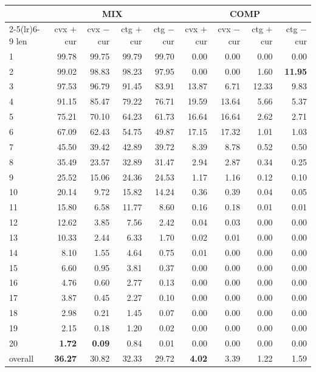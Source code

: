 \documentclass[11pt]{article}
\begin{document}
\begin{table}[h]\centering\footnotesize
\begin{tabular}{lrrrrrrrr}
\toprule
& \multicolumn{4}{c}{MIX} & \multicolumn{4}{c}{COMP} \\
\cmidrule(lr){2-5}\cmidrule(lr){6-9}
len & cvx $+$cur & cvx $-$cur & ctg $+$cur & ctg $-$cur & cvx $+$cur & cvx $-$cur & ctg $+$cur & ctg $-$cur \\
\midrule
1 & 99.78 & 99.75 & 99.79 & 99.70 & 0.00 & 0.00 & 0.00 & 0.00 \\
2 & 99.02 & 98.83 & 98.23 & 97.95 & 0.00 & 0.00 & 1.60 & \textbf{11.95} \\
3 & 97.53 & 96.79 & 91.45 & 83.91 & 13.87 & 6.71 & 12.33 & 9.83 \\
4 & 91.15 & 85.47 & 79.22 & 76.71 & 19.59 & 13.64 & 5.66 & 5.37 \\
5 & 75.21 & 70.10 & 64.23 & 61.73 & 16.64 & 16.64 & 2.62 & 2.71 \\
6 & 67.09 & 62.43 & 54.75 & 49.87 & 17.15 & 17.32 & 1.01 & 1.03 \\
7 & 45.50 & 39.42 & 42.89 & 39.72 & 8.39 & 8.78 & 0.52 & 0.50 \\
8 & 35.49 & 23.57 & 32.89 & 31.47 & 2.94 & 2.87 & 0.34 & 0.25 \\
9 & 25.52 & 15.06 & 24.36 & 24.53 & 1.17 & 1.16 & 0.12 & 0.10 \\
10 & 20.14 & 9.72 & 15.82 & 14.24 & 0.36 & 0.39 & 0.04 & 0.05 \\
11 & 15.80 & 6.58 & 11.77 & 8.60 & 0.16 & 0.18 & 0.01 & 0.01 \\
12 & 12.62 & 3.85 & 7.56 & 2.42 & 0.04 & 0.03 & 0.00 & 0.00 \\
13 & 10.33 & 2.44 & 6.33 & 1.70 & 0.02 & 0.01 & 0.00 & 0.00 \\
14 & 8.10 & 1.55 & 4.64 & 0.75 & 0.01 & 0.00 & 0.00 & 0.00 \\
15 & 6.60 & 0.95 & 3.81 & 0.37 & 0.00 & 0.00 & 0.00 & 0.00 \\
16 & 4.76 & 0.60 & 2.77 & 0.13 & 0.00 & 0.00 & 0.00 & 0.00 \\
17 & 3.87 & 0.45 & 2.27 & 0.10 & 0.00 & 0.00 & 0.00 & 0.00 \\
18 & 2.98 & 0.21 & 1.45 & 0.07 & 0.00 & 0.00 & 0.00 & 0.00 \\
19 & 2.15 & 0.18 & 1.20 & 0.02 & 0.00 & 0.00 & 0.00 & 0.00 \\
20 & \textbf{1.72} & \textbf{0.09} & 0.84 & 0.01 & 0.00 & 0.00 & 0.00 & 0.00 \\
\midrule
overall & \textbf{36.27} & 30.82 & 32.33 & 29.72 & \textbf{4.02} & 3.39 & 1.22 & 1.59 \\
\bottomrule
\end{tabular}
\end{table}
\end{document}
